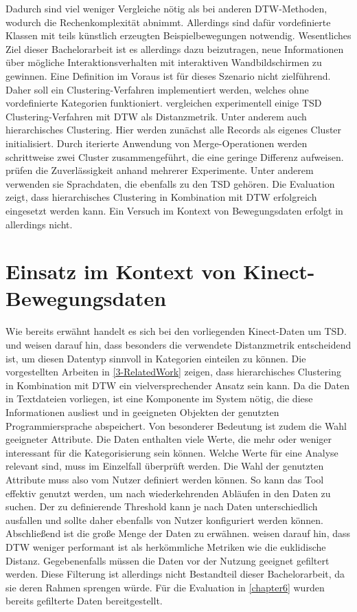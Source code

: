 Dadurch sind viel weniger Vergleiche nötig als bei anderen \ac{DTW}-Methoden,
wodurch die Rechenkomplexität abnimmt.
Allerdings sind dafür vordefinierte Klassen mit teils künstlich erzeugten Beispielbewegungen notwendig.
Wesentliches Ziel dieser Bachelorarbeit ist es allerdings dazu beizutragen, neue Informationen
über mögliche Interaktionsverhalten mit interaktiven Wandbildschirmen zu gewinnen.
Eine Definition im Voraus ist für dieses Szenario nicht zielführend.
Daher soll ein Clustering-Verfahren implementiert werden,
welches ohne vordefinierte Kategorien funktioniert.
\citet{hautamaki_time-series_2008} vergleichen experimentell einige \ac*{TSD} Clustering-Verfahren
mit \ac{DTW} als Distanzmetrik.
Unter anderem auch hierarchisches Clustering.
Hier werden zunächst alle Records als eigenes Cluster initialisiert.
Durch iterierte Anwendung von Merge-Operationen werden schrittweise zwei Cluster zusammengeführt,
die eine geringe Differenz aufweisen.
\citet{hautamaki_time-series_2008} prüfen die Zuverlässigkeit anhand mehrerer Experimente.
Unter anderem verwenden sie Sprachdaten, die ebenfalls zu den \ac{TSD} gehören.
Die Evaluation zeigt, dass hierarchisches Clustering in Kombination mit \ac{DTW} erfolgreich eingesetzt werden kann.
Ein Versuch im Kontext von Bewegungsdaten erfolgt in \citet{hautamaki_time-series_2008} allerdings nicht.

\section{Einsatz im Kontext von Kinect-Bewegungsdaten}
\label{3-Einsatz}
Wie bereits erwähnt handelt es sich bei den vorliegenden Kinect-Daten um \ac{TSD}.
\citet{warren_liao_clustering_2005} und \citet{aghabozorgi_time-series_2015} weisen darauf hin,
dass besonders die verwendete Distanzmetrik entscheidend ist,
um diesen Datentyp sinnvoll in Kategorien einteilen zu können.
Die vorgestellten Arbeiten in \autoref{3-RelatedWork} zeigen,
dass hierarchisches Clustering in Kombination mit \ac{DTW} ein vielversprechender Ansatz sein kann.
Da die Daten in Textdateien vorliegen, ist eine Komponente im System nötig,
die diese Informationen ausliest und in geeigneten Objekten der genutzten Programmiersprache abspeichert.
Von besonderer Bedeutung ist zudem die Wahl geeigneter Attribute.
Die Daten enthalten viele Werte, die mehr oder weniger interessant für die Kategorisierung sein können.
Welche Werte für eine Analyse relevant sind, muss im Einzelfall überprüft werden.
Die Wahl der genutzten Attribute muss also vom Nutzer definiert werden können.
So kann das Tool effektiv genutzt werden, um nach wiederkehrenden Abläufen in den Daten zu suchen.
Der zu definierende Threshold kann je nach Daten unterschiedlich ausfallen
und sollte daher ebenfalls von Nutzer konfiguriert werden können.
Abschließend ist die große Menge der Daten zu erwähnen.
\citet{aghabozorgi_time-series_2015} weisen darauf hin,
dass \ac{DTW} weniger performant ist als herkömmliche Metriken wie die euklidische Distanz.
Gegebenenfalls müssen die Daten vor der Nutzung geeignet gefiltert werden.
Diese Filterung ist allerdings nicht Bestandteil dieser Bachelorarbeit,
da sie deren Rahmen sprengen würde.
Für die Evaluation in \autoref{chapter6} wurden bereits gefilterte Daten bereitgestellt.